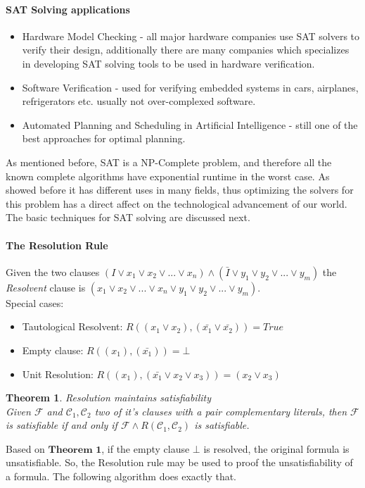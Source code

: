\documentclass[]{article}
\newtheorem{theorem}{Theorem}
\begin{document}
	\paragraph{SAT Solving applications}
	\begin{itemize}
		\item Hardware Model Checking - all major hardware companies use SAT solvers to verify their design, additionally there are many companies which specializes in developing SAT solving tools to be used in hardware verification.
		\item Software Verification - used for verifying embedded systems in cars, airplanes, refrigerators etc. usually not over-complexed software.
		\item Automated Planning and Scheduling in Artificial Intelligence - still one of the best approaches for optimal planning.
	\end{itemize}
	
	As mentioned before, SAT is a NP-Complete problem, and therefore all the known complete algorithms have exponential runtime in the worst case. As showed before it has different uses in many fields, thus optimizing the solvers for this problem has a direct affect on the technological advancement of our world. The basic techniques for SAT solving are discussed next.

	\paragraph{The Resolution Rule} Given the two clauses $ (I \lor x_1 \lor x_2 \lor ... \lor x_n)  \land (\bar{I} \lor y_1 \lor y_2 \lor ... \lor y_m)$ the \textit{Resolvent} clause is $ (x_1 \lor x_2 \lor ... \lor x_n \lor y_1 \lor y_2 \lor ... \lor y_m) $. \\
	Special cases:
	\begin{itemize}
		\item Tautological Resolvent: $ R((x_1 \lor x_2), (\bar{x_1} \lor \bar{x_2})) = True $
		\item Empty clause: $ R((x_1), (\bar{x_1})) = \bot $
		\item Unit Resolution: $ R((x_1), (\bar{x_1} \lor x_2 \lor x_3)) = (x_2 \lor x_3)$
	\end{itemize}
	
	\begin{theorem}
		Resolution maintains satisfiability\\
		Given $ \mathcal{F} $ and $ \mathcal{C}_1, \mathcal{C}_2 $ two of it's clauses with a pair complementary literals, then $ \mathcal{F} $ is satisfiable if and only if $ \mathcal{F} \land R(\mathcal{C}_1, \mathcal{C}_2) $ is satisfiable.
	\end{theorem}
	Based on $\textbf{Theorem 1}$, if the empty clause $\bot$ is resolved, the original formula is unsatisfiable. So, the Resolution rule may be used to proof the unsatisfiability of a formula. The following algorithm does exactly that.
	\pagebreak
	
\end{document}
